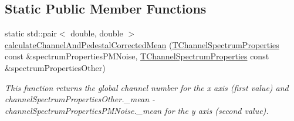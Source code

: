 \subsection*{Static Public Member Functions}
\begin{DoxyCompactItemize}
\item 
static std\-::pair$<$ double, double $>$ \hyperlink{class_run_comparator_a7e9217ea3aff2f7f2b94760b8df8884a}{calculate\-Channel\-And\-Pedestal\-Corrected\-Mean} (\hyperlink{class_t_channel_spectrum_properties}{T\-Channel\-Spectrum\-Properties} const \&spectrum\-Properties\-P\-M\-Noise, \hyperlink{class_t_channel_spectrum_properties}{T\-Channel\-Spectrum\-Properties} const \&spectrum\-Properties\-Other)
\begin{DoxyCompactList}\small\item\em This function returns the global channel number for the x axis (first value) and {\ttfamily channel\-Spectrum\-Properties\-Other.\-\_\-mean} -\/ {\ttfamily channel\-Spectrum\-Properties\-P\-M\-Noise.\-\_\-mean} for the y axis (second value). \end{DoxyCompactList}\end{DoxyCompactItemize}

